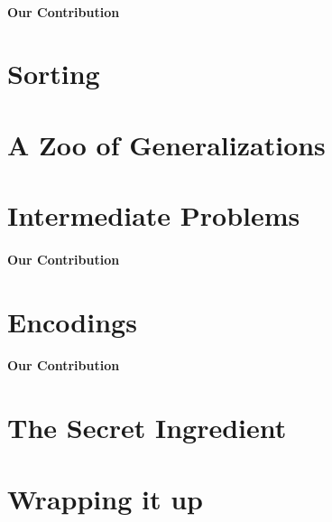 \paragraph{Our Contribution}


\section*{Sorting}


\section*{A Zoo of Generalizations}





\section*{Intermediate Problems}

\paragraph{Our Contribution}


\section*{Encodings}

\paragraph{Our Contribution}


\section*{The Secret Ingredient}


\section*{Wrapping it up}

